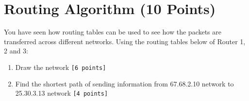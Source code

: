 \documentclass{scrartcl}
\begin{document}

\section{Routing Algorithm (10 Points)}
You have seen how routing tables can be used to see how the packets are transferred across different networks. Using the routing tables below of Router 1, 2 and 3:
\begin{enumerate}
\item Draw the network \texttt{[6 points]}
\item Find the shortest path of sending information from 67.68.2.10 network to 25.30.3.13 network \texttt{[4 points]}
\end{enumerate}
\end{document}
